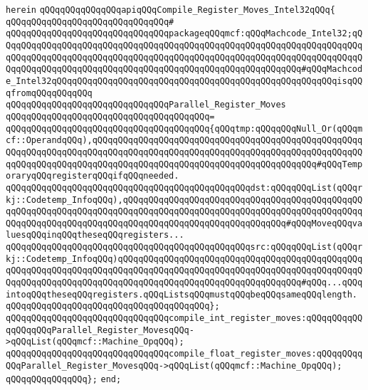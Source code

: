 \verb|herein|\newline
\newline
\verb|qQQqqQQqqQQqqQQqapiqQQqCompile_Register_Moves_Intel32qQQq{|\newline
\verb|qQQqqQQqqQQqqQQqqQQqqQQqqQQqqQQq#|\newline
\verb|qQQqqQQqqQQqqQQqqQQqqQQqqQQqqQQqpackageqQQqmcf:qQQqMachcode_Intel32;qQQqqQQqqQQqqQQqqQQqqQQqqQQqqQQqqQQqqQQqqQQqqQQqqQQqqQQqqQQqqQQqqQQqqQQqqQQqqQQqqQQqqQQqqQQqqQQqqQQqqQQqqQQqqQQqqQQqqQQqqQQqqQQqqQQqqQQqqQQqqQQqqQQqqQQqqQQqqQQqqQQqqQQqqQQqqQQqqQQqqQQqqQQqqQQqqQQqqQQq#qQQqMachcode_Intel32qQQqqQQqqQQqqQQqqQQqqQQqqQQqqQQqqQQqqQQqqQQqqQQqqQQqqQQqisqQQqfromqQQqqQQqqQQq|\newline
\newline
\verb|qQQqqQQqqQQqqQQqqQQqqQQqqQQqqQQqParallel_Register_Moves|\newline
\verb|qQQqqQQqqQQqqQQqqQQqqQQqqQQqqQQqqQQqqQQq=|\newline
\verb|qQQqqQQqqQQqqQQqqQQqqQQqqQQqqQQqqQQqqQQq{qQQqtmp:qQQqqQQqNull_Or(qQQqmcf::OperandqQQq),qQQqqQQqqQQqqQQqqQQqqQQqqQQqqQQqqQQqqQQqqQQqqQQqqQQqqQQqqQQqqQQqqQQqqQQqqQQqqQQqqQQqqQQqqQQqqQQqqQQqqQQqqQQqqQQqqQQqqQQqqQQqqQQqqQQqqQQqqQQqqQQqqQQqqQQqqQQqqQQqqQQqqQQqqQQqqQQqqQQqqQQq#qQQqTemporaryqQQqregisterqQQqifqQQqneeded.|\newline
\verb|qQQqqQQqqQQqqQQqqQQqqQQqqQQqqQQqqQQqqQQqqQQqqQQqdst:qQQqqQQqList(qQQqrkj::Codetemp_InfoqQQq),qQQqqQQqqQQqqQQqqQQqqQQqqQQqqQQqqQQqqQQqqQQqqQQqqQQqqQQqqQQqqQQqqQQqqQQqqQQqqQQqqQQqqQQqqQQqqQQqqQQqqQQqqQQqqQQqqQQqqQQqqQQqqQQqqQQqqQQqqQQqqQQqqQQqqQQqqQQqqQQqqQQqqQQqqQQq#qQQqMoveqQQqvaluesqQQqinqQQqtheseqQQqregisters...|\newline
\verb|qQQqqQQqqQQqqQQqqQQqqQQqqQQqqQQqqQQqqQQqqQQqqQQqsrc:qQQqqQQqList(qQQqrkj::Codetemp_InfoqQQq)qQQqqQQqqQQqqQQqqQQqqQQqqQQqqQQqqQQqqQQqqQQqqQQqqQQqqQQqqQQqqQQqqQQqqQQqqQQqqQQqqQQqqQQqqQQqqQQqqQQqqQQqqQQqqQQqqQQqqQQqqQQqqQQqqQQqqQQqqQQqqQQqqQQqqQQqqQQqqQQqqQQqqQQqqQQqqQQq#qQQq...qQQqintoqQQqtheseqQQqregisters.qQQqListsqQQqmustqQQqbeqQQqsameqQQqlength.|\newline
\verb|qQQqqQQqqQQqqQQqqQQqqQQqqQQqqQQqqQQqqQQq};|\newline
\newline
\verb|qQQqqQQqqQQqqQQqqQQqqQQqqQQqqQQqcompile_int_register_moves:qQQqqQQqqQQqqQQqqQQqParallel_Register_MovesqQQq->qQQqList(qQQqmcf::Machine_OpqQQq);|\newline
\verb|qQQqqQQqqQQqqQQqqQQqqQQqqQQqqQQqcompile_float_register_moves:qQQqqQQqqQQqParallel_Register_MovesqQQq->qQQqList(qQQqmcf::Machine_OpqQQq);|\newline
\verb|qQQqqQQqqQQqqQQq};|\newline
\verb|end;|\newline


